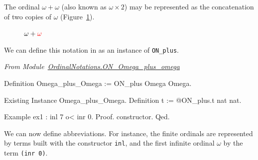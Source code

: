 The ordinal $\omega+\omega$ (also known as $\omega\times 2$) may be represented as the concatenation 
of two copies of $\omega$ (Figure~\ref{fig:omega-plus-omega}).

\begin{figure}[h]
   \centering
   \caption{\textcolor{blue}{$\omega+{\color{red}\omega}$}}
   \label{fig:omega-plus-omega}
 \end{figure}

We can define this notation in \coq{} as an instance of \texttt{ON\_plus}.


\vspace{4pt}
\noindent\emph{From Module~\href{../theories/html/hydras.OrdinalNotations.ON_Omega_plus_omega.html}{OrdinalNotations.ON\_Omega\_plus\_omega}}

\begin{Coqsrc}
Definition Omega_plus_Omega := ON_plus Omega Omega.

Existing Instance Omega_plus_Omega.
Definition t := @ON_plus.t nat nat.
\end{Coqsrc}

\begin{Coqsrc}
Example ex1 : inl 7 o< inr 0.
Proof. constructor. Qed.
\end{Coqsrc}

We can now define abbreviations. For instance, the finite ordinals are represented by terms built with  the constructor \texttt{inl}, and the first infinite ordinal $\omega$ by the term \texttt{(inr 0)}.

